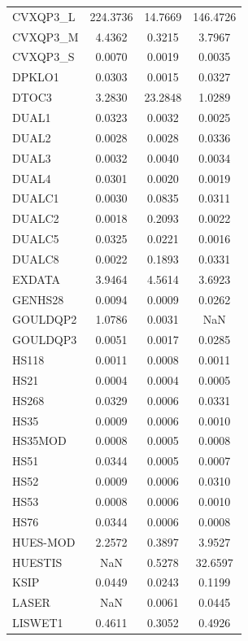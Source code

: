\begin{longtable}{lccc}
CVXQP3\_L & 224.3736 &  14.7669 & 146.4726 \\
CVXQP3\_M &   4.4362 &   0.3215 &   3.7967 \\
CVXQP3\_S &   0.0070 &   0.0019 &   0.0035 \\
DPKLO1   &   0.0303 &   0.0015 &   0.0327 \\
DTOC3    &   3.2830 &  23.2848 &   1.0289 \\
DUAL1    &   0.0323 &   0.0032 &   0.0025 \\
DUAL2    &   0.0028 &   0.0028 &   0.0336 \\
DUAL3    &   0.0032 &   0.0040 &   0.0034 \\
DUAL4    &   0.0301 &   0.0020 &   0.0019 \\
DUALC1   &   0.0030 &   0.0835 &   0.0311 \\
DUALC2   &   0.0018 &   0.2093 &   0.0022 \\
DUALC5   &   0.0325 &   0.0221 &   0.0016 \\
DUALC8   &   0.0022 &   0.1893 &   0.0331 \\
EXDATA   &   3.9464 &   4.5614 &   3.6923 \\
GENHS28  &   0.0094 &   0.0009 &   0.0262 \\
GOULDQP2 &   1.0786 &   0.0031 &      NaN \\
GOULDQP3 &   0.0051 &   0.0017 &   0.0285 \\
HS118    &   0.0011 &   0.0008 &   0.0011 \\
HS21     &   0.0004 &   0.0004 &   0.0005 \\
HS268    &   0.0329 &   0.0006 &   0.0331 \\
HS35     &   0.0009 &   0.0006 &   0.0010 \\
HS35MOD  &   0.0008 &   0.0005 &   0.0008 \\
HS51     &   0.0344 &   0.0005 &   0.0007 \\
HS52     &   0.0009 &   0.0006 &   0.0310 \\
HS53     &   0.0008 &   0.0006 &   0.0010 \\
HS76     &   0.0344 &   0.0006 &   0.0008 \\
HUES-MOD &   2.2572 &   0.3897 &   3.9527 \\
HUESTIS  &      NaN &   0.5278 &  32.6597 \\
KSIP     &   0.0449 &   0.0243 &   0.1199 \\
LASER    &      NaN &   0.0061 &   0.0445 \\
LISWET1  &   0.4611 &   0.3052 &   0.4926 \\

\end{longtable}
